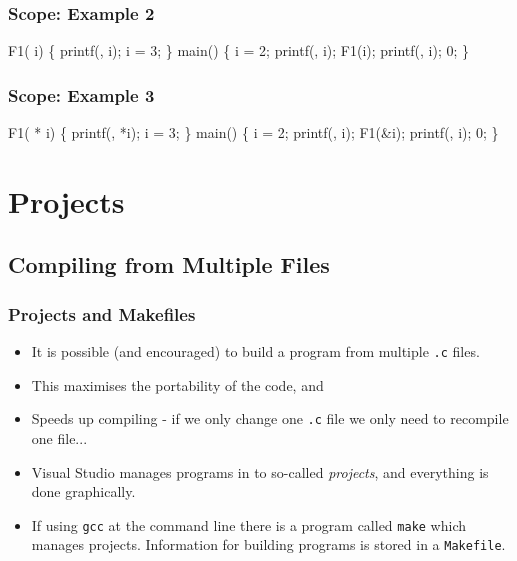 \documentclass[smaller,handout,table]{beamer}
\begin{document}
\begin{frame}[fragile]
\frametitle{Scope: Example 2}
\vspace{-0.1in}
\begin{semiverbatim}
\kr\kl{} 
\kl
\kl{} F1( i)
\kl\{
\kl   printf(, i);
\kl   i = 3;  
\kl\}
\kl
\kl{} main()
\kl\{
\kl   {} i = 2;
\kl   printf(, i);
\kl   F1(i);
\kl   printf(, i);
\kl   {} 0;
\kl\}
\end{semiverbatim}
\end{frame}

\begin{frame}[fragile]
\frametitle{Scope: Example 3}
\vspace{-0.1in}
\begin{semiverbatim}
\kr\kl{} 
\kl
\kl{} F1( * i)
\kl\{
\kl   printf(, *i);
\kl   *i = 3;  
\kl\}
\kl
\kl{} main()
\kl\{
\kl   {} i = 2;
\kl   printf(, i);
\kl   F1(\&i);
\kl   printf(, i);
\kl   {} 0;
\kl\}
\end{semiverbatim}
\end{frame}

\section{Projects}
\subsection{Compiling from Multiple Files}
\begin{frame}
\frametitle{Projects and Makefiles}
\begin{itemize}
\item It is possible (and encouraged) to build a program from multiple {\tt .c} files.
\item This maximises the portability of the code, and
\item Speeds up compiling - if we only change one {\tt .c} file we only need to recompile one file...
\item Visual Studio manages programs in to so-called \emph{projects}, and everything is done graphically.
\item If using \texttt{gcc} at the command line there is a program called {\tt make} which manages projects. Information for building programs is stored in a \texttt{Makefile}.
\end{itemize}
\end{frame}
\end{document}
